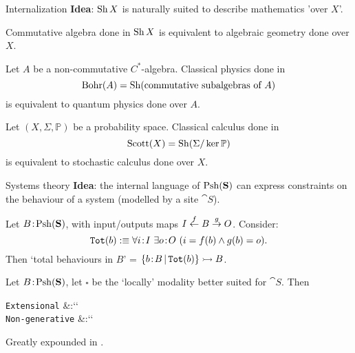 \begin{frame}{Internalization}
	\textbf{Idea}: $\operatorname{Sh} X$ is naturally suited to describe mathematics 'over $X$'.

	\begin{example}
		Commutative algebra done in $\operatorname{Sh} X$ is equivalent to algebraic geometry done over $X$.
	\end{example}
	\begin{example}
		Let $A$ be a non-commutative $C^*$-algebra.
		Classical physics done in
		\begin{equation*}
			\operatorname{Bohr}(A) = \operatorname{Sh}(\text{commutative subalgebras of $A$})
		\end{equation*}
		is equivalent to quantum physics done over $A$.
	\end{example}
	\begin{example}
		Let $(X,\Sigma, \mathbb P)$ be a probability space. Classical calculus done in
		\begin{equation*}
			\operatorname{Scott}(X) = \operatorname{Sh} (\Sigma / \ker \mathbb{P})
		\end{equation*}
		is equivalent to stochastic calculus done over $X$.
	\end{example}
\end{frame}

\begin{frame}{Systems theory}
	\textbf{Idea}: the internal language of $\operatorname{Psh}(\mathbf{S})$ can express constraints on the behaviour of a system (modelled by a site $\cat S$).

	\begin{example}
		Let $B \!:\! \operatorname{Psh}(\mathbf{S})$, with input/outputs maps $I \overset{f}{\leftarrow} B \overset{g}{\to} O$. Consider:
		\begin{equation*}
			\texttt{Tot}(b) :\equiv \forall i \!:\! I\ \exists o \!:\! O\ (i = f(b) \land g(b) = o).
		\end{equation*}
		Then `total behaviours in $B$' = $\{ b \!:\! B \,|\, \texttt{Tot}(b)\} \rightarrowtail B$.
	\end{example}
	\begin{example}
		Let $B \!:\! \operatorname{Psh} (\mathbf{S})$, let $\square$ be the `locally' modality better suited for $\cat S$. Then
		\begin{eqalign*}
			\texttt{Extensional} &:\equiv ``\\
			\texttt{Non-generative} &:\equiv ``
		\end{eqalign*}
	\end{example}
	Greatly expounded in \cite{schultz2019temporal}.
\end{frame}
